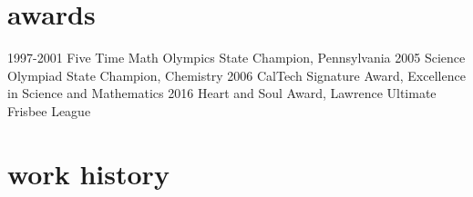 \documentclass[]{twentysecondcv}
\begin{document}

\section{awards}

\begin{twentyshort}
  \twentyitemshort
    {1997-2001}
	{Five Time Math Olympics State Champion, Pennsylvania}
  \twentyitemshort
    {2005}
    {Science Olympiad State Champion, Chemistry}
  \twentyitemshort
    {2006}
    {CalTech Signature Award, Excellence in Science and Mathematics}
  \twentyitemshort
    {2016}
    {Heart and Soul Award, Lawrence Ultimate Frisbee League}
\end{twentyshort}


\section{work history}
\end{document}
